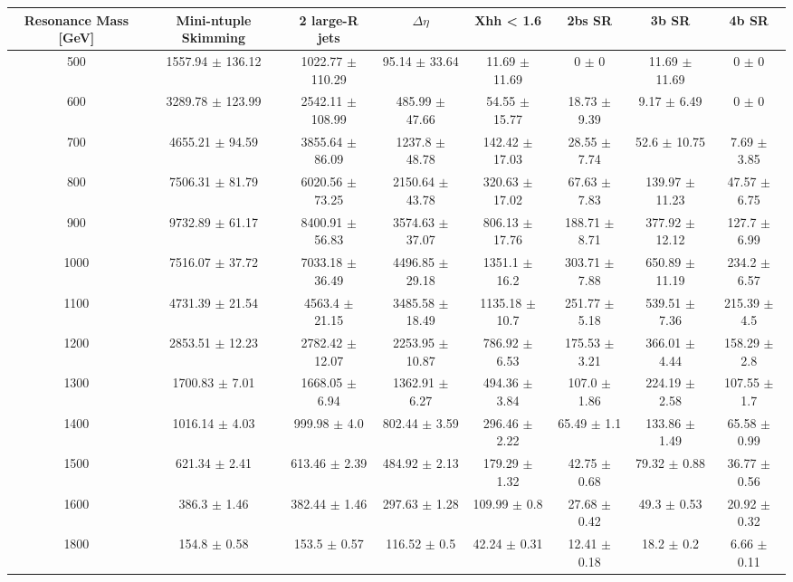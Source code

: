\begin{footnotesize} 
\begin{tabular}{c|c|c|c|c|c|c|c} 
Resonance Mass [GeV] & Mini-ntuple Skimming & 2 large-R jets & $\Delta\eta$ & Xhh < 1.6 & 2bs SR & 3b SR & 4b SR \\ 
\hline\hline 
500 & 1557.94 $\pm$ 136.12 & 1022.77 $\pm$ 110.29 & 95.14 $\pm$ 33.64 & 11.69 $\pm$ 11.69 & 0 $\pm$ 0 & 11.69 $\pm$ 11.69 & 0 $\pm$ 0\\ 
600 & 3289.78 $\pm$ 123.99 & 2542.11 $\pm$ 108.99 & 485.99 $\pm$ 47.66 & 54.55 $\pm$ 15.77 & 18.73 $\pm$ 9.39 & 9.17 $\pm$ 6.49 & 0 $\pm$ 0\\ 
700 & 4655.21 $\pm$ 94.59 & 3855.64 $\pm$ 86.09 & 1237.8 $\pm$ 48.78 & 142.42 $\pm$ 17.03 & 28.55 $\pm$ 7.74 & 52.6 $\pm$ 10.75 & 7.69 $\pm$ 3.85\\ 
800 & 7506.31 $\pm$ 81.79 & 6020.56 $\pm$ 73.25 & 2150.64 $\pm$ 43.78 & 320.63 $\pm$ 17.02 & 67.63 $\pm$ 7.83 & 139.97 $\pm$ 11.23 & 47.57 $\pm$ 6.75\\ 
900 & 9732.89 $\pm$ 61.17 & 8400.91 $\pm$ 56.83 & 3574.63 $\pm$ 37.07 & 806.13 $\pm$ 17.76 & 188.71 $\pm$ 8.71 & 377.92 $\pm$ 12.12 & 127.7 $\pm$ 6.99\\ 
1000 & 7516.07 $\pm$ 37.72 & 7033.18 $\pm$ 36.49 & 4496.85 $\pm$ 29.18 & 1351.1 $\pm$ 16.2 & 303.71 $\pm$ 7.88 & 650.89 $\pm$ 11.19 & 234.2 $\pm$ 6.57\\ 
1100 & 4731.39 $\pm$ 21.54 & 4563.4 $\pm$ 21.15 & 3485.58 $\pm$ 18.49 & 1135.18 $\pm$ 10.7 & 251.77 $\pm$ 5.18 & 539.51 $\pm$ 7.36 & 215.39 $\pm$ 4.5\\ 
1200 & 2853.51 $\pm$ 12.23 & 2782.42 $\pm$ 12.07 & 2253.95 $\pm$ 10.87 & 786.92 $\pm$ 6.53 & 175.53 $\pm$ 3.21 & 366.01 $\pm$ 4.44 & 158.29 $\pm$ 2.8\\ 
1300 & 1700.83 $\pm$ 7.01 & 1668.05 $\pm$ 6.94 & 1362.91 $\pm$ 6.27 & 494.36 $\pm$ 3.84 & 107.0 $\pm$ 1.86 & 224.19 $\pm$ 2.58 & 107.55 $\pm$ 1.7\\ 
1400 & 1016.14 $\pm$ 4.03 & 999.98 $\pm$ 4.0 & 802.44 $\pm$ 3.59 & 296.46 $\pm$ 2.22 & 65.49 $\pm$ 1.1 & 133.86 $\pm$ 1.49 & 65.58 $\pm$ 0.99\\ 
1500 & 621.34 $\pm$ 2.41 & 613.46 $\pm$ 2.39 & 484.92 $\pm$ 2.13 & 179.29 $\pm$ 1.32 & 42.75 $\pm$ 0.68 & 79.32 $\pm$ 0.88 & 36.77 $\pm$ 0.56\\ 
1600 & 386.3 $\pm$ 1.46 & 382.44 $\pm$ 1.46 & 297.63 $\pm$ 1.28 & 109.99 $\pm$ 0.8 & 27.68 $\pm$ 0.42 & 49.3 $\pm$ 0.53 & 20.92 $\pm$ 0.32\\ 
1800 & 154.8 $\pm$ 0.58 & 153.5 $\pm$ 0.57 & 116.52 $\pm$ 0.5 & 42.24 $\pm$ 0.31 & 12.41 $\pm$ 0.18 & 18.2 $\pm$ 0.2 & 6.66 $\pm$ 0.11\\ 

\end{tabular}
\end{footnotesize}
